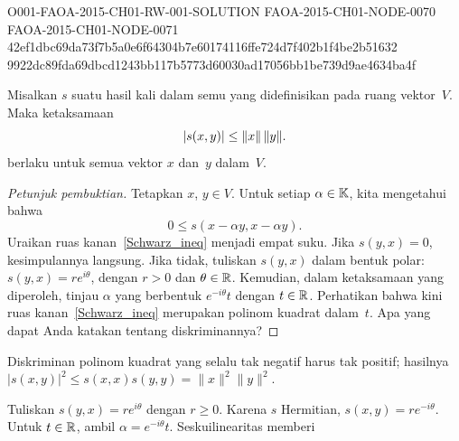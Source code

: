 \begin{o001readerwork}
  {O001-FAOA-2015-CH01-RW-001-SOLUTION}
  {FAOA-2015-CH01-NODE-0070}
  {FAOA-2015-CH01-NODE-0071}
  {42ef1dbc69da73f7b5a0e6f64304b7e60174116ffe724d7f402b1f4be2b51632}
  {9922dc89fda69dbcd1243bb117b5773d60030ad17056bb1be739d9ae4634ba4f}
\begin{o001result}
\begin{thm}\label{00015002} Misalkan $s$ suatu hasil kali dalam semu yang didefinisikan pada ruang vektor~$V$.
Maka ketaksamaan
   \[ \lvert s(x,y)\rvert \le \lVert x\rVert \,\lVert y\rVert. \]
berlaku untuk semua vektor $x$ dan~$y$ dalam~$V$.
\end{thm}
\end{o001result}
\begin{o001sourcehint}
\begin{proof}[\emph{Petunjuk pembuktian}] Tetapkan $x$, $y \in V$. Untuk setiap $\alpha \in \mathbb{K}$, kita mengetahui bahwa
  \begin{equation}\label{Schwarz_ineq}
      0 \le s(x - \alpha y, x - \alpha y) .
  \end{equation}
Uraikan ruas kanan~\eqref{Schwarz_ineq} menjadi empat suku. Jika $s(y,x)=0$, kesimpulannya langsung. Jika tidak,
tuliskan $s(y,x)$ dalam bentuk polar: $s(y,x) = r e^{i\theta}$, dengan $r > 0$ dan $\theta \in \mathbb{R}$.
Kemudian, dalam ketaksamaan yang diperoleh, tinjau $\alpha$ yang berbentuk $e^{-i\theta}t$ dengan
$t \in \mathbb{R}$. Perhatikan bahwa kini ruas kanan~\eqref{Schwarz_ineq} merupakan polinom kuadrat dalam~$t$. Apa yang dapat Anda katakan tentang
diskriminannya? \ns
\end{proof}
\end{o001sourcehint}
\begin{o001answer}
Diskriminan polinom kuadrat yang selalu tak negatif harus tak positif; hasilnya
$|s(x,y)|^2\leq s(x,x)s(y,y)=\|x\|^2\|y\|^2$.
\end{o001answer}
\begin{o001proof}
Tuliskan $s(y,x)=re^{i\theta}$ dengan $r\geq0$. Karena $s$ Hermitian,
$s(x,y)=re^{-i\theta}$. Untuk $t\in\mathbb{R}$, ambil
$\alpha=e^{-i\theta}t$. Seskuilinearitas memberi
\begin{align*}

\end{align*}
\end{o001proof}
\end{o001readerwork}
